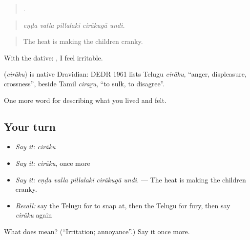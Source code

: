 \begin{quote}
    .
\end{quote}

\begin{quote}
\emph{eṇḍa valla pillalaki cirākugā undi.}
\end{quote}

\begin{quote}
The heat is making the children cranky.
\end{quote}

With the dative:   , I feel irritable.

\begin{cousinweb}
\textbf{} (\emph{cirāku}) is native Dravidian: DEDR 1961 lists Telugu \emph{cirāku}, \textquotedblleft{}anger, displeasure, crossness\textquotedblright{}, beside Tamil \emph{ciraṟu}, \textquotedblleft{}to sulk, to disagree\textquotedblright{}.
\end{cousinweb}

\begin{grammarlens}[title={What you've built}]
One more word for describing what you lived and felt.
\end{grammarlens}

\subsection*{Your turn}
\begin{itemize}
\raggedright
  \item \emph{Say it:} \emph{cirāku}
  \item \emph{Say it:} \emph{cirāku}, once more
  \item \emph{Say it:} \emph{eṇḍa valla pillalaki cirākugā undi.} — The heat is making the children cranky.
  \item \emph{Recall:} say the Telugu for to snap at, then the Telugu for fury, then say \emph{cirāku} again
\end{itemize}

\begin{tcolorbox}[breakable,colback=teal!4,colframe=teal!35!black,title={Before you move on}]
What does  mean? (\textquotedblleft{}Irritation; annoyance\textquotedblright{}.) Say it once more.
\end{tcolorbox}
